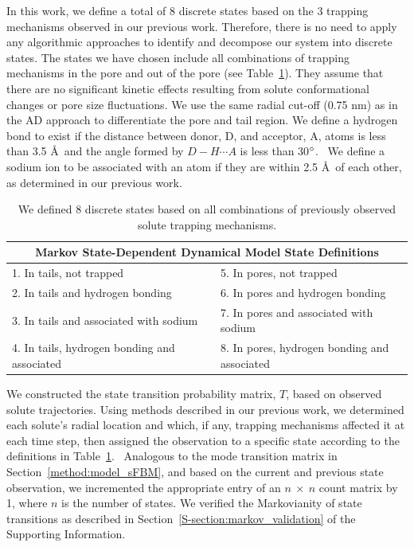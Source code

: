 \documentclass[journal=jctcce,manuscript=article]{achemso}
\begin{document}
  In this work, we define a total of 8 discrete states based on the 3 trapping
  mechanisms observed in our previous work. Therefore, there is no need to
  apply any algorithmic approaches to identify and decompose our system into
  discrete states. The states we have chosen include all combinations of
  trapping mechanisms in the pore and out of the pore (see
  Table~\ref{table:states}). They assume that there are no significant kinetic
  effects resulting from solute conformational changes or pore size
  fluctuations. We use the same radial cut-off (0.75 nm) as in the AD approach to
  differentiate the pore and tail region. We define a hydrogen bond to exist
  if the distance between donor, D, and acceptor, A, atoms is less than 3.5
  \AA~and the angle formed by $D-H \cdots A$ is less than
  30$\degree$.~\cite{luzar_effect_1996} We define a sodium ion to be associated
  with an atom if they are within 2.5 \AA~of each other, as determined in our
  previous work.~\cite{coscia_chemically_2019}
  
  \begin{table}[!htb]
	  \centering
	  \begin{tabular}{ll}
            \hline
            \hline
	  \multicolumn{2}{c}{Markov State-Dependent Dynamical Model State Definitions} \\
	  \hline
	  1. In tails, not trapped                      & 5. In pores, not trapped                     \\
	  2. In tails and hydrogen bonding              & 6. In pores and hydrogen bonding             \\
	  3. In tails and associated with sodium        & 7. In pores and associated with sodium       \\
	  4. In tails, hydrogen bonding and associated  ~~~~& 8. In pores, hydrogen bonding and associated \\
	  \hline
          \hline
	  \end{tabular}
	  \caption{We defined 8 discrete states based on all combinations of previously observed solute
	  trapping mechanisms.}\label{table:states}  
  \end{table}
  
  We constructed the state transition probability matrix, $T$, based on
  observed solute trajectories. Using methods described in our previous work,
  we determined each solute's radial location and which, if any, trapping
  mechanisms affected it at each time step, then assigned the observation to a
  specific state according to the definitions in
  Table~\ref{table:states}.~\cite{coscia_chemically_2019} Analogous to the mode
  transition matrix in Section~\ref{method:model_sFBM}, and based on the
  current and previous state observation, we incremented the appropriate entry
  of an $n~\times~n$ count matrix by 1, where $n$ is the number of states. We
  verified the Markovianity of state transitions as described in
  Section~\ref{S-section:markov_validation} of the Supporting Information.
  
\end{document}

